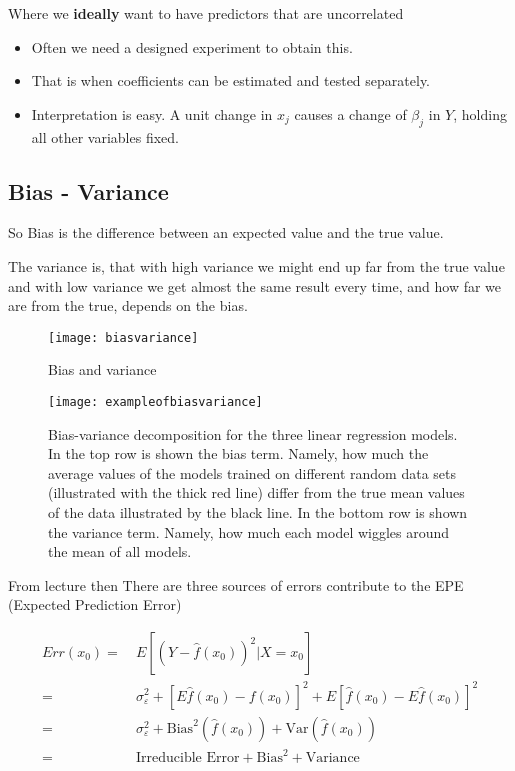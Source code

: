 Where we \textbf{ideally} want to have predictors that are uncorrelated
\begin{itemize}
  \item Often we need a designed experiment to obtain this.
  \item That is when coefficients can be estimated and tested separately.
  \item Interpretation is easy. A unit change in $x_j$ causes a change of $\beta_j$ in $Y$, holding all other variables fixed.
\end{itemize}

\subsection{Bias - Variance}

So Bias is the difference between an expected value and the true value.

The variance is, that with high variance we might end up far from the true value and with low variance we get almost the same result every time, and how far we are from the true, depends on the bias.

\begin{figure}[H]
  \centering
  \texttt{[image: biasvariance]}
  \caption{Bias and variance}\label{fig:biasvariance}
\end{figure}

\begin{figure}[H]
  \centering
  \texttt{[image: exampleofbiasvariance]}
  \caption{Bias-variance decomposition for the three linear regression models. In the top row is shown the bias term. Namely, how much the average values of the models trained on different random data sets (illustrated with the thick red line) differ from the true mean values of the data illustrated by the black line. In the bottom row is shown the variance term. Namely, how much each model wiggles around the mean of all models.}\label{fig:exampleofbiasvariance}
\end{figure}


From lecture \cite[p.~48]{lecture1} then There are three sources of errors contribute to the EPE (Expected Prediction Error)

\begin{equation}
  \begin{split}
     Err(x_0) =  & \: E[(Y- \hat{f}(x_0))^2 | X = x_0] \\
       =& \: \sigma^2_\varepsilon + [E \hat{f}(x_0) - f(x_0)]^2 + E[\hat{f}(x_0) - E\hat{f}(x_0)]^2 \\
       =& \: \sigma_\varepsilon^2 + \text{Bias}^2 (\hat{f}(x_0)) + \text{Var}(\hat{f}(x_0)) \\
       =& \: \text{Irreducible Error} + \text{Bias}^2 + \text{Variance}
  \end{split}
\end{equation}

